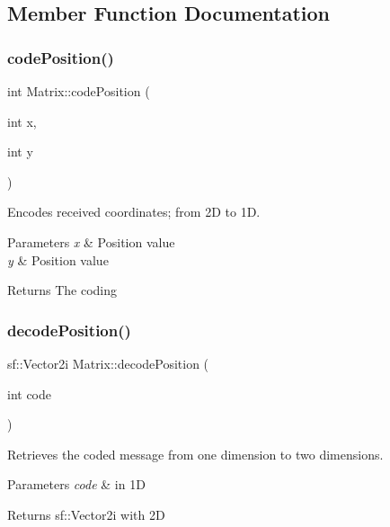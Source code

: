 \subsection{Member Function Documentation}
\mbox{\label{classMatrix_ac4c14902c7108f0f9ac46ee9d1ef92f9}} 
\subsubsection{\texorpdfstring{code\+Position()}{codePosition()}}
{\footnotesize\ttfamily int Matrix\+::code\+Position (\begin{DoxyParamCaption}\item[{int}]{x,  }\item[{int}]{y }\end{DoxyParamCaption})}



Encodes received coordinates; from 2D to 1D. 


\begin{DoxyParams}{Parameters}
{\em x} & Position value \\
\hline
{\em y} & Position value \\
\hline
\end{DoxyParams}
\begin{DoxyReturn}{Returns}
The coding 
\end{DoxyReturn}
\mbox{\label{classMatrix_a5680e2198758d4b7524810d0e0fe4021}} 
\subsubsection{\texorpdfstring{decode\+Position()}{decodePosition()}}
{\footnotesize\ttfamily sf\+::\+Vector2i Matrix\+::decode\+Position (\begin{DoxyParamCaption}\item[{int}]{code }\end{DoxyParamCaption})}



Retrieves the coded message from one dimension to two dimensions. 


\begin{DoxyParams}{Parameters}
{\em code} & in 1D \\
\hline
\end{DoxyParams}
\begin{DoxyReturn}{Returns}
sf\+::\+Vector2i with 2D 
\end{DoxyReturn}
\mbox{\label{classMatrix_a3af39c453aeb30c5cb55f72c2e71917f}} 
